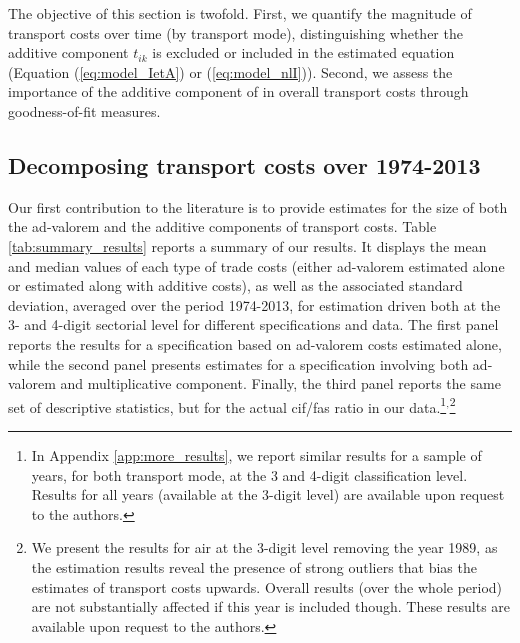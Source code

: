 \documentclass[a4paper,11pt]{article}
\begin{document}
The objective of this section is twofold. First, we quantify the magnitude of transport costs over time (by transport mode), distinguishing whether the additive component $t_{ik}$ is excluded or included in the estimated equation (Equation (\ref{eq:model_IetA}) or (\ref{eq:model_nlI})). Second, we assess the importance of the additive component of in overall transport costs through goodness-of-fit measures.


\subsection{Decomposing transport costs over 1974-2013}

Our first contribution to the literature is to provide estimates for the size of both the ad-valorem and the additive components of transport costs. Table \ref{tab:summary_results} reports a summary of our results. It displays the mean and median values of each type of trade costs (either ad-valorem estimated alone or estimated along with additive costs), as well as the associated standard deviation, averaged over the period 1974-2013, for estimation driven both at the 3- and 4-digit sectorial level for different specifications and data. The first panel reports the results for a specification based on ad-valorem costs estimated alone, while the second panel presents estimates for a specification involving both ad-valorem and multiplicative component. Finally, the third panel reports the same set of descriptive statistics, but for the actual cif/fas ratio in our data.\footnote{In Appendix \ref{app:more_results}, we report similar results for a sample of years, for both transport mode, at the 3 and 4-digit classification level. Results for all years (available at the 3-digit level) are available upon request to the authors.}$^{,}$\footnote{We present the results for air at the 3-digit level removing the year 1989, as the estimation results reveal the presence of strong outliers that bias the estimates of transport costs upwards. Overall results (over the whole period) are not substantially affected if this year is included though. These results are available upon request to the authors.}
\end{document}
